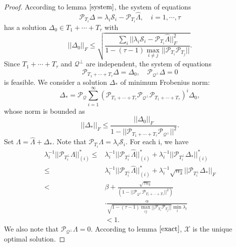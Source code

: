 \documentclass[journal,transmag]{IEEEtran}
\theoremstyle{plain}
\begin{document}
\begin{proof}
According to lemma $\ref{system}$, the system of equations
\begin{equation}
{\mathcal{P}_{T_i}\Delta = \lambda_i \mathcal{S}_i - \mathcal{P}_{T_i}\hat{\Lambda}, \quad i=1,\cdots,\tau }
\end{equation}
has a solution $\Delta_0 \in T_1 + \cdots + T_{\tau}$ with
\begin{equation}
{||\Delta_0||_F \le \sqrt{\frac{\sum_i ||\lambda_i \mathcal{S}_i - \mathcal{P}_{T_i}\hat{\Lambda}||^2_F}{1-(\tau-1)\max_{i\not=j}||\mathcal{P}_{T_i}\mathcal{P}_{T_j}||}}.}
\end{equation}
Since $T_1 + \cdots +T_{\tau}$ and $\mathcal{Q}^{\bot}$ are independent, the system of equations
\begin{equation}
{\mathcal{P}_{T_1 + \cdots + T_{\tau}}\Delta = \Delta_0, \quad \mathcal{P}_{\mathcal{Q}^{\bot}}\Delta=0 }
\end{equation}
is feasible. We consider a solution $\Delta_{*}$ of minimum Frobenius norm:
\begin{equation}
{\Delta_* = \mathcal{P}_{\mathcal{Q}}\sum_{i=1}^{\infty}(\mathcal{P}_{T_1+\cdots+T_{\tau}}\mathcal{P}_{\mathcal{Q}^{\bot}}\mathcal{P}_{T_1+\cdots+T_{\tau}})^i \Delta_0,}
\end{equation}
whose norm is bounded as
\begin{equation}
{||\Delta_*||_F\le \frac{||\Delta_0||_F}{1-||\mathcal{P}_{T_1+\cdots+T_{\tau}}\mathcal{P}_{\mathcal{Q}^{\bot}}||^2}.}
\end{equation}
Set $\Lambda = \hat{\Lambda}+\Delta_*$. Note that $\mathcal{P}_{T_i}\Lambda = \lambda_i \mathcal{S}_i.$ For each i, we have
\begin{equation}
\begin{split}
\lambda_i^{-1}||\mathcal{P}_{T_i^{\bot}}\Lambda||_{(i)}^* \le & \lambda_i^{-1}||\mathcal{P}_{T_i^{\bot}}\hat{\Lambda}||_{(i)}^*
+\lambda_i^{-1}||\mathcal{P}_{T_i^{\bot}}\Delta_*||_{(i)}^* \\
\le & \lambda_i^{-1}||\mathcal{P}_{T_i^{\bot}}\hat{\Lambda}||_{(i)}^*
+\lambda_i^{-1}\sqrt{n_3}||\mathcal{P}_{T_i^{\bot}}\Delta_*||_F \\
< & \beta + \frac{\sqrt{\tau n_3}}{(1-||\mathcal{P}_{\mathcal{Q}^{\bot}}\mathcal{P}_{T_1+\cdots+T_{\tau}}||^2)}\\
& \cdot \frac{\alpha}{\sqrt{1-(\tau-1)\max_{ij}||\mathcal{P}_{T_i}\mathcal{P}_{T_j}||}\min_l \lambda_l} \\
& <1 .
\end{split}
\end{equation}
We also note that $\mathcal{P}_{\mathcal{Q}^{\bot}}\Lambda =0.$ According to lemma $\ref{exact}$, $\mathcal{X}$ is the unique optimal solution.
\end{proof}
\end{document}
